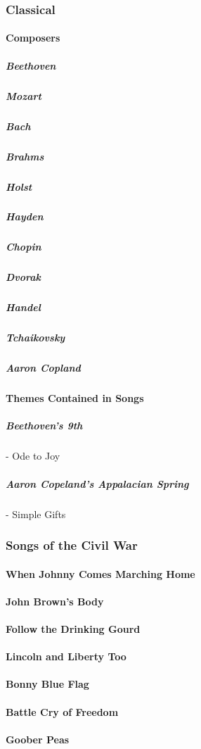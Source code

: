 					
					
			\subsubsection{Classical}
				\paragraph{Composers}
					\subparagraph{Beethoven}
					\subparagraph{Mozart}
					\subparagraph{Bach}
					\subparagraph{Brahms}
					\subparagraph{Holst}
					\subparagraph{Hayden}
					\subparagraph{Chopin}
					\subparagraph{Dvorak}
					\subparagraph{Handel}
					\subparagraph{Tchaikovsky}
					\subparagraph{Aaron Copland}
					
				
				\paragraph{Themes Contained in Songs}
				
					\subparagraph {Beethoven's 9th} -  Ode to Joy
					\subparagraph{Aaron Copeland's Appalacian Spring} - Simple Gifts
				
			
			\newpage
			\subsubsection{Songs of the Civil War}
			\label{CivilWarSongs}
				\paragraph{When Johnny Comes Marching Home}
				\paragraph{John Brown's Body}
				\paragraph {Follow the Drinking Gourd}
				\paragraph{Lincoln and Liberty Too}
				\paragraph{Bonny Blue Flag}
				\paragraph{Battle Cry of Freedom}
				\paragraph{Goober Peas}

